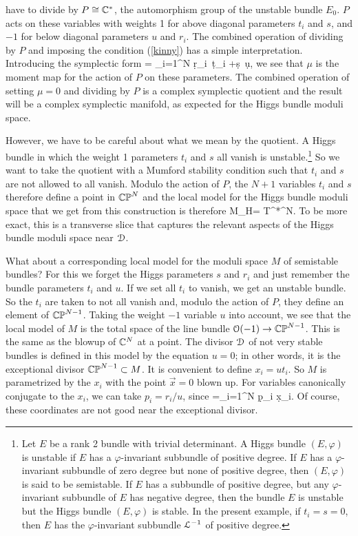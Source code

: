 \documentclass[11pt,a4paper]{article}
\begin{document}
have to divide by $P\cong {\mathbb C}^*$, the automorphism group of the unstable bundle $E_0$.   $P$ acts on these variables with weights 1 for above diagonal
parameters $t_i$ and $s$, and $-1$ for below diagonal parameters $u$ and $r_i$.    The combined operation of dividing by $P$ and imposing the condition
(\ref{kinny}) has a simple interpretation.      Introducing the symplectic form
\be\label{inny}\Omega = \sum_{i=1}^N \d r_i\, \d t_i +\d s \,\d u, \ee 
we see that $\mu$ is the moment map for the action of $P$ on these parameters.   The combined operation of setting $\mu=0$ and dividing by $P$
 is a complex symplectic quotient and the result will be a complex symplectic manifold, as expected for the Higgs bundle moduli space.

However, we have to be careful about what we mean by the quotient.   A Higgs bundle in which the weight 1 parameters $t_i$ and $s$ all vanish
is unstable.\footnote{Let $E$ be a rank 2 bundle with trivial determinant.  A Higgs bundle $(E,\varphi)$ is unstable if $E$ has a $\varphi$-invariant
subbundle  of positive degree. If $E$ has a $\varphi$-invariant subbundle of zero degree but none of positive degree, then $(E,\varphi)$ is said to be semistable.
  If $E$ has a subbundle of positive degree, but any  $\varphi$-invariant subbundle of $E$ has negative degree, then the bundle $E$ is
unstable but the Higgs bundle $(E,\varphi)$ is  stable.   In the present example, if $t_i=s=0$, then $E$ has the $\varphi$-invariant subbundle 
${\mathcal L}^{-1}$ of positive degree.}  So we want to take the quotient
with a Mumford stability condition such that $t_i$ and $s$ are not allowed to all vanish.   Modulo the action of $P$, the $N+1$ variables 
$t_i$ and $s$ therefore define a point in 
${\mathbb{CP}}^N$ and   the local model for the Higgs bundle moduli space that we get from this construction  is therefore
\be\label{hb} M_H= T^*\bCP^N. \ee
To be more exact, this is a transverse slice that captures the relevant aspects of the Higgs bundle moduli space near ${\mathcal D}$.

What about a corresponding local model for the moduli space $M$ of semistable bundles?   For this we forget the Higgs parameters $s$ and $r_i$
and just remember the bundle parameters $t_i$ and $u$.   If we set all $t_i$ to vanish, we get an unstable bundle.   So the $t_i$ are taken to not
all vanish and, modulo the action of $P$, they define an element of ${\mathbb{CP}}^{N-1}$.   
Taking the weight $-1$ variable $u$ into account, we see
that the local model of $M$ is the total space of the line bundle ${\mathcal O}(-1)\to {\mathbb{CP}}^{N-1}$.    This is the same as the blowup of ${\mathbb C}^N$ at a point.
The divisor ${\mathcal D}$ of not very stable bundles is defined in this model by the equation $u=0$; in other words, it is the exceptional divisor 
${\mathbb{CP}}^{N-1}\subset M$.    It is convenient to define $x_i= u t_i$.   So $M$ is parametrized by the $x_i$ with the point $\vec x=0$ blown up.
For variables canonically conjugate to the $x_i$, we can take $p_i=r_i/u$, since
\be\label{wobo}\Omega =\sum_{i=1}^N \d p_i \d x_i. \ee
Of course, these coordinates are not good near the exceptional divisor.
\end{document}
